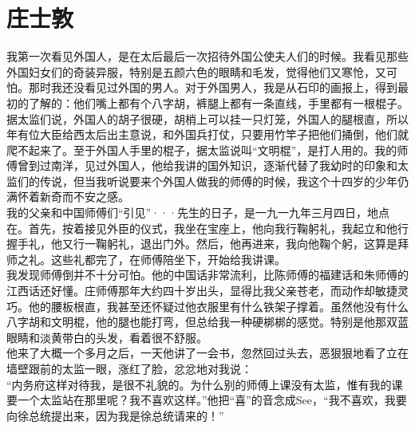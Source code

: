 \fancyhead[RO]{} %
\fancyhead[LE]{} %
\chapter*{庄士敦}
\thispagestyle{empty}
我第一次看见外国人，是在太后最后一次招待外国公使夫人们的时候。我看见那些外国妇女们的奇装异服，特别是五颜六色的眼睛和毛发，觉得他们又寒怆，又可怕。那时我还没看见过外国的男人。对于外国男人，我是从石印的画报上，得到最初的了解的：他们嘴上都有个八字胡，裤腿上都有一条直线，手里都有一根棍子。据太监们说，外国人的胡子很硬，胡梢上可以挂一只灯笼，外国人的腿根直，所以年有位大臣给西太后出主意说，和外国兵打仗，只要用竹竿子把他们捅倒，他们就爬不起来了。至于外国人手里的棍子，据太监说叫“文明棍”，是打人用的。我的师傅曾到过南洋，见过外国人，他给我讲的国外知识，逐渐代替了我幼时的印象和太监们的传说，但当我听说要来个外国人做我的师傅的时候，我这个十四岁的少年仍满怀着新奇而不安之感。\\

我的父亲和中国师傅们“引见”···先生的日子，是一九一九年三月四日，地点在。首先，按着接见外臣的仪式，我坐在宝座上，他向我行鞠躬礼，我起立和他行握手礼，他又行一鞠躬礼，退出门外。然后，他再进来，我向他鞠个躬，这算是拜师之礼。这些礼都完了，在师傅陪坐下，开始给我讲课。\\

我发现师傅倒并不十分可怕。他的中国话非常流利，比陈师傅的福建话和朱师傅的江西话还好懂。庄师傅那年大约四十岁出头，显得比我父亲苍老，而动作却敏捷灵巧。他的腰板根直，我甚至还怀疑过他衣服里有什么铁架子撑着。虽然他没有什么八字胡和文明棍，他的腿也能打弯，但总给我一种硬梆梆的感觉。特别是他那双蓝眼睛和淡黄带白的头发，看着很不舒服。\\

他来了大概一个多月之后，一天他讲了一会书，忽然回过头去，恶狠狠地看了立在墙壁跟前的太监一眼，涨红了脸，忿忿地对我说：\\

“内务府这样对待我，是很不礼貌的。为什么别的师傅上课没有太监，惟有我的课要一个太监站在那里呢？我不喜欢这样。”他把“喜”的音念成See，“我不喜欢，我要向徐总统提出来，因为我是徐总统请来的！”\\


